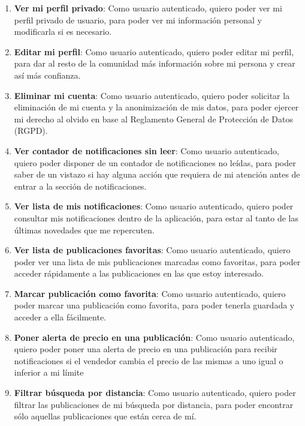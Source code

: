 \begin{enumerate}[label=HU-\protect\twodigits{\arabic*}:, align=left, leftmargin=*]

\item \textbf{Ver mi perfil privado}: Como usuario autenticado, quiero poder ver mi perfil privado de usuario, para poder ver mi información personal y modificarla si es necesario.

\item \textbf{Editar mi perfil}: Como usuario autenticado, quiero poder editar mi perfil, para dar al resto de la comunidad más información sobre mi persona y crear así más confianza.

\item \textbf{Eliminar mi cuenta}: Como usuario autenticado, quiero poder solicitar la eliminación de mi cuenta y la anonimización de mis datos, para poder ejercer mi derecho al olvido en base al Reglamento General de Protección de Datos (RGPD).

\item \textbf{Ver contador de notificaciones sin leer}: Como usuario autenticado, quiero poder disponer de un contador de notificaciones no leídas, para poder saber de un vistazo si hay alguna acción que requiera de mi atención antes de entrar a la sección de notificaciones.

\item \textbf{Ver lista de mis notificaciones}: Como usuario autenticado, quiero poder consultar mis notificaciones dentro de la aplicación, para estar al tanto de las últimas novedades que me repercuten.

\item \textbf{Ver lista de publicaciones favoritas}: Como usuario autenticado, quiero poder ver una lista de mis publicaciones marcadas como favoritas, para poder acceder rápidamente a las publicaciones en las que estoy interesado.

\item \textbf{Marcar publicación como favorita}: Como usuario autenticado, quiero poder marcar una publicación como favorita, para poder tenerla guardada y acceder a ella fácilmente.

\item \textbf{Poner alerta de precio en una publicación}: Como usuario autenticado, quiero poder poner una alerta de precio en una publicación para recibir notificaciones si el vendedor cambia el precio de las mismas a uno igual o inferior a mi límite

\item \textbf{Filtrar búsqueda por distancia}: Como usuario autenticado, quiero poder filtrar las publicaciones de mi búsqueda por distancia, para poder encontrar sólo aquellas publicaciones que están cerca de mí.


\end{enumerate}
